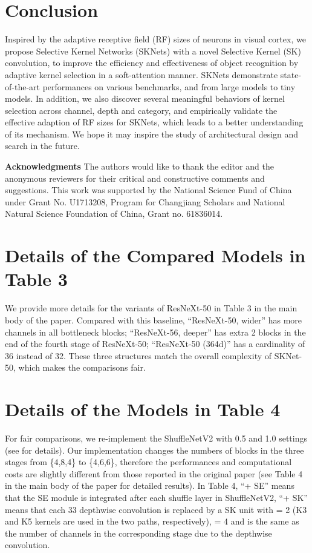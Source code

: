 \documentclass[10pt,twocolumn,letterpaper]{article}
\begin{document}
	
	\section{Conclusion}
	Inspired by the adaptive receptive field (RF) sizes of neurons in visual cortex, we propose Selective Kernel Networks (SKNets) with a novel Selective Kernel (SK) convolution, to improve the efficiency and effectiveness of object recognition by adaptive kernel selection in a soft-attention manner. SKNets demonstrate state-of-the-art performances on various benchmarks, and from large models to tiny models. In addition, we also discover several meaningful behaviors of kernel selection across channel, depth and category, and empirically validate the effective adaption of RF sizes for SKNets, which leads to a better understanding of its mechanism. We hope it may inspire the study of architectural design and search in the future. 
	
	\textbf{Acknowledgments}
	The authors would like to thank the editor and the anonymous reviewers for their critical and constructive comments and suggestions. This work was supported by the National Science Fund of China under Grant No. U1713208, Program for Changjiang Scholars and National Natural Science Foundation of China, Grant no. 61836014. 
	
	{\small
		
		
	}

\appendix
\renewcommand{\thetable}{S\arabic{table}}
\renewcommand{\thefigure}{S\arabic{figure}}
\section{Details of the Compared Models in Table 3}
We provide more details for the variants of ResNeXt-50 in Table 3 in the main body of the paper. Compared with this baseline, ``ResNeXt-50, wider'' has  more channels in all  bottleneck blocks; ``ResNeXt-56, deeper'' has extra 2 blocks in the end of the fourth stage of ResNeXt-50; ``ResNeXt-50 (364d)'' has a cardinality of 36 instead of 32. These three structures match the overall complexity of SKNet-50, which makes the comparisons fair.
	
\section{Details of the Models in Table 4}
For fair comparisons, we re-implement the ShuffleNetV2 \cite{ma2018shufflenet} with 0.5 and 1.0 settings (see \cite{ma2018shufflenet} for details). Our implementation changes the numbers of blocks in the three stages from \{4,8,4\} to \{4,6,6\}, therefore the performances and computational costs are slightly different from those reported in the original paper \cite{ma2018shufflenet} (see Table 4 in the main body of the paper for detailed results). In Table 4, ``+ SE'' means that the SE module \cite{hu2017squeeze} is integrated after each shuffle layer in ShuffleNetV2, ``+ SK'' means that each 33 depthwise convolution is replaced by a SK unit with  = 2 (K3 and K5 kernels are used in the two paths, respectively),  = 4 and  is the same as the number of channels in the corresponding stage due to the depthwise convolution.
\end{document}
